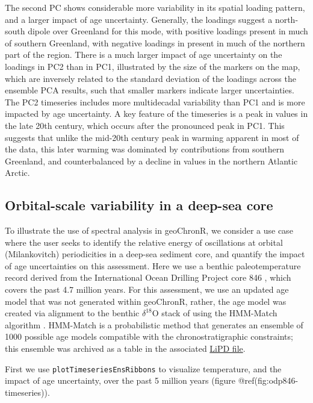 \documentclass[gchron, manuscript]{copernicus}
\begin{document}
The second PC shows considerable more variability in its spatial loading
pattern, and a larger impact of age uncertainty. Generally, the loadings
suggest a north-south dipole over Greenland for this mode, with positive
loadings present in much of southern Greenland, with negative loadings
in present in much of the northern part of the region. There is a much
larger impact of age uncertainty on the loadings in PC2 than in PC1,
illustrated by the size of the markers on the map, which are inversely
related to the standard deviation of the loadings across the ensemble
PCA results, such that smaller markers indicate larger uncertainties.
The PC2 timeseries includes more multidecadal variability than PC1 and
is more impacted by age uncertainty. A key feature of the timeseries is
a peak in values in the late 20th century, which occurs after the
pronounced peak in PC1. This suggests that unlike the mid-20th century
peak in warming apparent in most of the data, this later warming was
dominated by contributions from southern Greenland, and counterbalanced
by a decline in values in the northern Atlantic Arctic.

\hypertarget{sec:spec_vignette}{%
\subsection{Orbital-scale variability in a deep-sea
core}\label{sec:spec_vignette}}

To illustrate the use of spectral analysis in geoChronR, we consider a
use case where the user seeks to identify the relative energy of
oscillations at orbital (Milankovitch) periodicities in a deep-sea
sediment core, and quantify the impact of age uncertainties on this
assessment. Here we use a benthic paleotemperature record derived from
the International Ocean Drilling Project core 846
\citep{mix1995benthic, Shackleton95}, which covers the past 4.7 million
years. For this assessment, we use an updated age model that was not
generated within geoChronR, rather, the age model was created via
alignment to the benthic \(\delta^{18}\mathrm{O}\) stack of
\citet{LisieckiRaymo05} using the HMM-Match algorithm
\citep{ProbStack, khider2017}. HMM-Match is a probabilistic method that
generates an ensemble of 1000 possible age models compatible with the
chronostratigraphic constraints; this ensemble was archived as a table
in the associated
\href{http://lipdverse.org/geoChronR-examples/ODP846.Lawrence.2006.lpd}{LiPD
file}.

First we use \texttt{plotTimeseriesEnsRibbons} to visualize temperature,
and the impact of age uncertainty, over the past 5 million years (figure
@ref(fig:odp846-timeseries)).
\end{document}

